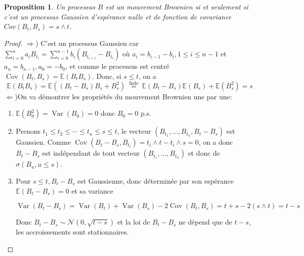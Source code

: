 \documentclass[A4paper,12pt]{report}
\newtheorem{proposition}{Proposition}[chapter]
\begin{document}
\begin{proposition}
Un processus $B$ est un mouvement Brownien si et seulement si c'est un processus Gaussien d'espérance nulle et de fonction de covariance $Cov(B_t , B_s) = s\wedge t$.
\end{proposition}
\begin{proof} $\Rightarrow$)
C'est un processus Gaussien car $\sum_{i=0}^{n} a_{i} B_{t_{i}}=\sum_{i=0}^{n-1} b_{i}\left(B_{t_{i+1}}-B_{t_{i}}\right)$ où $a_{i}=b_{i-1}-b_{i}, 1 \leq i \leq n-1$ et $a_{n}=b_{n-1}, a_{0}=-b_{0}$, et comme le processus est centré $\operatorname{Cov}\left(B_{t}, B_{s}\right)=\mathbb{E}\left(B_{t} B_{s}\right)$. Donc, si $s \leq t$, on a
$$
\mathbb{E}\left(B_{t} B_{s}\right)=\mathbb{E}\left(\left(B_{t}-B_{s}\right) B_{s}+B_{s}^{2}\right) \stackrel{\text { Inde }}{=} \mathbb{E}\left(B_{t}-B_{s}\right) \mathbb{E}\left(B_{s}\right)+\mathbb{E}\left(B_{s}^{2}\right)=s 
$$
$\Leftarrow$)On va démontrer les propriétés du mouvement Brownien une par une:
\begin{enumerate}
\item $\mathbb{E}\left(B_{0}^{2}\right)=\operatorname{Var}\left(B_{0}\right)=0$ donc $B_{0}=0$ p.s.
\item Prenons $t_{1} \leq t_{2} \leq \cdots \leq t_{n} \leq s \leq t$, le vecteur $\left(B_{t_{1}}, \ldots, B_{t_{n}}, B_{t}-B_{s}\right)$ est Gaussien. Comme $\operatorname{Cov}\left(B_{t}-B_{s}, B_{t_{i}}\right)=t_{i} \wedge t-t_{i} \wedge s=0$, on a donc $B_{t}-B_{s}$ est indépendant de tout vecteur $\left(B_{t_{1}}, \ldots, B_{t_{n}}\right)$ et donc de $\sigma\left(B_{u}, u \leq s\right)$.

\item Pour $s \leq t, B_{t}-B_{s}$ est Gaussienne, donc déterminée par son espérance $\mathbb{E}\left(B_{t}-B_{s}\right)=0$ et sa variance

$$
\operatorname{Var}\left(B_{t}-B_{s}\right)=\operatorname{Var}\left(B_{t}\right)+\operatorname{Var}\left(B_{s}\right)-2 \operatorname{Cov}\left(B_{t}, B_{s}\right)=t+s-2( s \wedge t)=t-s
$$

Donc $B_{t}-B_{s} \sim \mathcal{N}(0, \sqrt{t-s})$ et la loi de $B_{t}-B_{s}$ ne dépend que de $t-s$, les accroissements sont stationnaires.
\end{enumerate}

\end{proof}
\end{document}
